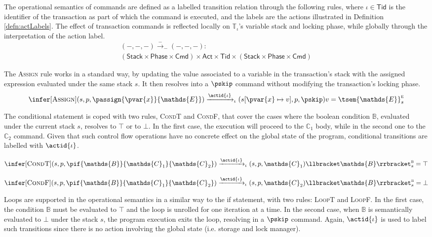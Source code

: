 The operational semantics of commands are defined as a labelled transition relation through the following rules, where $\iota \in \mathsf{Tid}$ is the identifier of the transaction as part of which the command is executed, and the labels are the actions illustrated in Definition \ref{defn:actLabels}. The effect of transaction commands is reflected locally on $\mathds{T}_\iota$'s variable stack and locking phase, while globally through the interpretation of the action label.
\begin{gather*}
	(-, -, -) \xrightarrow{-}_- (-, -, -) : \\
	\left( \mathsf{Stack} \times \mathsf{Phase} \times \mathsf{Cmd} \right)
	\times \mathsf{Act} \times \mathsf{Tid} \times
	\left( \mathsf{Stack} \times \mathsf{Phase} \times \mathsf{Cmd} \right)
\end{gather*}

The \textsc{Assign} rule works in a standard way, by updating the value associated to a variable in the transaction's stack with the assigned expression evaluated under the same stack $s$. It then resolves into a $\pskip$ command without modifying the transaction's locking phase.
\[
\infer[\textsc{Assign}]
{
	(s, p, \passign{\pvar{x}}{\mathds{E}})
	\xrightarrow{\actid{\iota}}_\iota
	(s[\pvar{x} \mapsto v], p, \pskip)
}
{
	v = \tsem{\mathds{E}}^\textsc{e}_s
}
\]

The conditional statement is coped with two rules, \textsc{CondT} and \textsc{CondF}, that cover the cases where the boolean condition $\mathds{B}$, evaluated under the current stack $s$, resolves to $\top$ or to $\bot$. In the first case, the execution will proceed to the $\mathds{C}_1$ body, while in the second one to the $\mathds{C}_2$ command. Given that such control flow operations have no concrete effect on the global state of the program, conditional transitions are labelled with $\actid{\iota}$.

\[
\infer[\textsc{CondT}]
{
	(s, p, \pif{\mathds{B}}{\mathds{C}_1}{\mathds{C}_2})
	\xrightarrow{\actid{\iota}}_\iota
	(s, p, \mathds{C}_1)
}
{
	\llbracket \mathds{B} \rrbracket_s^\textsc{b} = \top
}
\]

\[
\infer[\textsc{CondF}]
{
	(s, p, \pif{\mathds{B}}{\mathds{C}_1}{\mathds{C}_2})
	\xrightarrow{\actid{\iota}}_\iota
	(s, p, \mathds{C}_2)
}
{
	\llbracket \mathds{B} \rrbracket_s^\textsc{b} = \bot
}
\]

Loops are supported in the operational semantics in a similar way to the if statement, with two rules: \textsc{LoopT} and \textsc{LoopF}. In the first case, the condition $\mathds{B}$ must be evaluated to $\top$ and the loop is unrolled for one iteration at a time. In the second case, when $\mathds{B}$ is semantically evaluated to $\bot$ under the stack $s$, the program execution exits the loop, resolving in a $\pskip$ command. Again, $\actid{\iota}$ is used to label such transitions since there is no action involving the global state (i.e. storage and lock manager).

